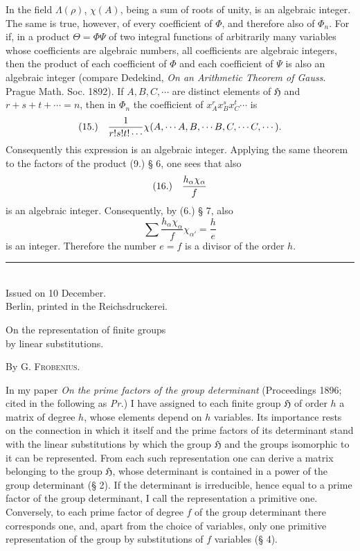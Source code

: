 \documentclass[11pt]{article}
\makeatletter
\newcommand{\Hgrp}{\mathfrak{H}}
\newcommand{\frobtagc}[2]{\[\begin{array}{@{}r@{\quad}c@{}}\textup{(#1)} & \displaystyle #2\end{array}\]}
\makeatother
\begin{document}
In the field $\Lambda(\rho)$, $\chi(A)$, being a sum of roots of unity, is an algebraic integer. The same is true, however, of every coefficient of $\Phi$, and therefore also of $\Phi_n$. For if, in a product $\Theta=\Phi\Psi$ of two integral functions of arbitrarily many variables whose coefficients are algebraic numbers, all coefficients are algebraic integers, then the product of each coefficient of $\Phi$ and each coefficient of $\Psi$ is also an algebraic integer (compare Dedekind, \emph{On an Arithmetic Theorem of Gauss}. Prague Math. Soc. 1892). If $A,B,C,\cdots$ are distinct elements of $\Hgrp$ and $r+s+t+\cdots=n$, then in $\Phi_n$ the coefficient of $x_A^rx_B^sx_C^t\cdots$ is
\frobtagc{15.}{\frac{1}{r!s!t!\cdots}\chi(A,\cdots A,B,\cdots B,C,\cdots C,\cdots).}
Consequently this expression is an algebraic integer. Applying the same theorem to the factors of the product (9.) § 6, one sees that also
\frobtagc{16.}{\frac{h_\alpha\chi_\alpha}{f}}
is an algebraic integer. Consequently, by (6.) § 7, also
\[
\sum\frac{h_\alpha\chi_\alpha}{f}\chi_{\alpha'}=\frac{h}{e}
\]
is an integer. Therefore the number $e=f$ is a divisor of the order $h$.

\begin{center}
\vspace{1.0em}
\rule{0.32\linewidth}{0.4pt}\\[0.35em]
Issued on 10 December.\\[1.8em]
{\scriptsize Berlin, printed in the Reichsdruckerei.}
\end{center}

\clearpage

\begin{center}
{\Large On the representation of finite groups\\by linear substitutions.}\par
\vspace{1.2em}
By G. \textsc{Frobenius}.
\end{center}
\vspace{1em}

In my paper \emph{On the prime factors of the group determinant} (Proceedings 1896; cited in the following as \emph{Pr.}) I have assigned to each finite group $\Hgrp$ of order $h$ a matrix of degree $h$, whose elements depend on $h$ variables. Its importance rests on the connection in which it itself and the prime factors of its determinant stand with the linear substitutions by which the group $\Hgrp$ and the groups isomorphic to it can be represented. From each such representation one can derive a matrix belonging to the group $\Hgrp$, whose determinant is contained in a power of the group determinant (§ 2). If the determinant is irreducible, hence equal to a prime factor of the group determinant, I call the representation a primitive one. Conversely, to each prime factor of degree $f$ of the group determinant there corresponds one, and, apart from the choice of variables, only one primitive representation of the group by substitutions of $f$ variables (§ 4).
\end{document}
